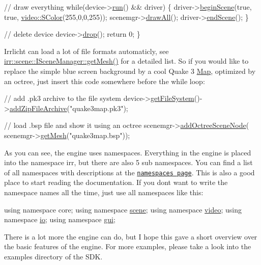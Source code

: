 \begin{DoxyCode}
 \textcolor{comment}{// draw everything}
 \textcolor{keywordflow}{while}(device->\hyperlink{classirr_1_1IrrlichtDevice_a0489f8151dc43f6f41503ffb5a160b35}{run}() && driver)
 \{
    driver->\hyperlink{classirr_1_1video_1_1IVideoDriver_a015b8f2f18c260a00a858181be1e9945}{beginScene}(\textcolor{keyword}{true}, \textcolor{keyword}{true}, \hyperlink{classirr_1_1video_1_1SColor}{video::SColor}(255,0,0,255));
    scenemgr->\hyperlink{classirr_1_1scene_1_1ISceneManager_a04240262904667c821bd9de5e5fd9b02}{drawAll}();
    driver->\hyperlink{classirr_1_1video_1_1IVideoDriver_a75f61a93c5fc9fdf161c044d27bc994e}{endScene}();
 \}

 \textcolor{comment}{// delete device}
 device->\hyperlink{classirr_1_1IReferenceCounted_a03856a09355b89d178090c4a5f738543}{drop}();
 \textcolor{keywordflow}{return} 0;
\}
\end{DoxyCode}


Irrlicht can load a lot of file formats automaticly, see \hyperlink{classirr_1_1scene_1_1ISceneManager_a63894c3f3d46cfc385116f1705935e03}{irr\+::scene\+::\+I\+Scene\+Manager\+::get\+Mesh()} for a detailed list. So if you would like to replace the simple blue screen background by a cool Quake 3 \hyperlink{classMap}{Map}, optimized by an octree, just insert this code somewhere before the while loop\+:


\begin{DoxyCode}
\textcolor{comment}{// add .pk3 archive to the file system}
device->\hyperlink{classirr_1_1IrrlichtDevice_a3d8d2dee2f57aa7e6c0d14592de3e6ed}{getFileSystem}()->\hyperlink{classirr_1_1io_1_1IFileSystem_aef11ff9b5c171d7b3a99d8a79b71f2b3}{addZipFileArchive}(\textcolor{stringliteral}{"quake3map.pk3"});

\textcolor{comment}{// load .bsp file and show it using an octree}
scenemgr->\hyperlink{classirr_1_1scene_1_1ISceneManager_a503339385ca2b33d7e8035a61c4eca84}{addOctreeSceneNode}(
   scenemgr->\hyperlink{classirr_1_1scene_1_1ISceneManager_a63894c3f3d46cfc385116f1705935e03}{getMesh}(\textcolor{stringliteral}{"quake3map.bsp"}));
\end{DoxyCode}


As you can see, the engine uses namespaces. Everything in the engine is placed into the namespace \textquotesingle{}irr\textquotesingle{}, but there are also 5 sub namespaces. You can find a list of all namespaces with descriptions at the \href{namespaces.html}{\tt namespaces page}. This is also a good place to start reading the documentation. If you don\textquotesingle{}t want to write the namespace names all the time, just use all namespaces like this\+: 
\begin{DoxyCode}
\textcolor{keyword}{using namespace }core;
\textcolor{keyword}{using namespace }\hyperlink{namespacescene}{scene};
\textcolor{keyword}{using namespace }\hyperlink{namespacevideo}{video};
\textcolor{keyword}{using namespace }\hyperlink{namespaceio}{io};
\textcolor{keyword}{using namespace }\hyperlink{namespacegui}{gui};
\end{DoxyCode}


There is a lot more the engine can do, but I hope this gave a short overview over the basic features of the engine. For more examples, please take a look into the examples directory of the S\+DK. 